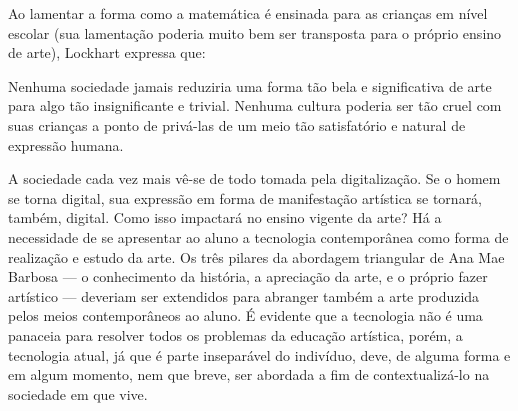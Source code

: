 \documentclass[12pt, a4paper]{article}
\begin{document}
Ao lamentar a forma como a matemática é ensinada para as crianças em nível escolar (sua lamentação poderia muito bem ser transposta para o próprio ensino de arte), Lockhart \cite{lockhart_lament} expressa que:

\begin{displayquote}
Nenhuma sociedade jamais reduziria uma forma tão bela e significativa de arte para algo tão insignificante e trivial. Nenhuma cultura poderia ser tão cruel com suas crianças a ponto de privá-las de um meio tão satisfatório e natural de expressão humana.
\end{displayquote}

A sociedade cada vez mais vê-se de todo tomada pela digitalização. Se o homem se torna digital, sua expressão em forma de 
manifestação artística se tornará, também, digital. Como isso impactará no ensino vigente da arte?
Há a necessidade de se apresentar ao aluno a tecnologia contemporânea como forma de realização e estudo da arte.
Os três pilares da abordagem triangular de Ana Mae Barbosa --- o conhecimento da história, a apreciação da arte, e o próprio fazer artístico ---
deveriam ser extendidos para abranger também a arte produzida pelos meios contemporâneos ao aluno.
É evidente que a tecnologia não é uma panaceia para resolver todos os problemas da educação artística, porém, a tecnologia atual, já que é parte
inseparável do indivíduo, deve, de alguma forma e em algum momento, nem que breve, ser abordada a fim de contextualizá-lo na sociedade em que vive.

\end{document}
